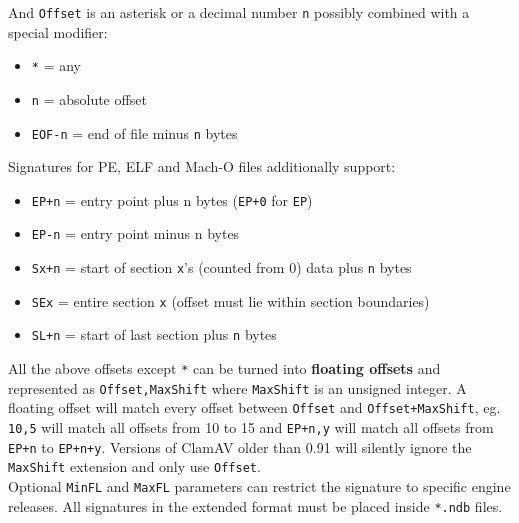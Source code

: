 \documentclass[a4paper,titlepage,12pt]{article}
\begin{document}
    And	\verb+Offset+ is an asterisk or a decimal number \verb+n+ possibly
    combined with a special modifier:
    \begin{itemize}
	\item \verb+*+ = any
	\item \verb+n+ = absolute offset
	\item \verb+EOF-n+ = end of file minus \verb+n+ bytes
    \end{itemize}
    Signatures for PE, ELF and Mach-O files additionally support:
    \begin{itemize}
	\item \verb#EP+n# = entry point plus n bytes (\verb#EP+0# for \verb+EP+)
	\item \verb#EP-n# = entry point minus n bytes
	\item \verb#Sx+n# = start of section \verb+x+'s (counted from 0)
	data plus \verb+n+ bytes
	\item \verb#SEx# = entire section \verb+x+ (offset must lie within section
	boundaries)
	\item \verb#SL+n# = start of last section plus \verb+n+ bytes
    \end{itemize}
    All the above offsets except \verb+*+ can be turned into
    \textbf{floating offsets} and represented as \verb+Offset,MaxShift+ where
    \verb+MaxShift+ is an unsigned integer. A floating offset will match every
    offset between \verb+Offset+ and \verb#Offset+MaxShift#, eg. \verb+10,5+
    will match all offsets from 10 to 15 and \verb#EP+n,y# will match all
    offsets from \verb#EP+n# to \verb#EP+n+y#. Versions of ClamAV older than
    0.91 will silently ignore the \verb+MaxShift+ extension and only use
    \verb+Offset+.\\

    \noindent
    Optional \verb+MinFL+ and \verb+MaxFL+ parameters can restrict the signature
    to specific engine releases. All signatures in the extended format must be
    placed inside \verb+*.ndb+ files.
\end{document}
